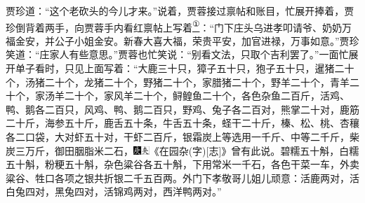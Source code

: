 贾珍道：``这个老砍头的今儿才来。''说着，贾蓉接过禀帖和账目，忙展开捧着，贾珍倒背着两手，向贾蓉手内看红禀帖上写着\href{../Text/part0057_split_000.html\#lnkback_1_a}{\textsuperscript{①}}：``门下庄头乌进孝叩请爷、奶奶万福金安，并公子小姐金安。新春大喜大福，荣贵平安，加官进禄，万事如意。''贾珍笑道：``庄家人有些意思。''贾蓉也忙笑说：``别看文法，只取个吉利罢了。''一面忙展开单子看时，只见上面写着：``大鹿三十只，獐子五十只，狍子五十只，暹猪二十个，汤猪二十个，龙猪二十个，野猪二十个，家腊猪二十个，野羊二十个，青羊二十个，家汤羊二十个，家风羊二十个，鲟鳇鱼二十个，各色杂鱼二百斤，活鸡、鸭、鹅各二百只，风鸡、鸭、鹅二百只，野鸡、兔子各二百对，熊掌二十对，鹿筋二十斤，海参五十斤，鹿舌五十条，牛舌五十条，蛏干二十斤，榛、松、桃、杏穰各二口袋，大对虾五十对，干虾二百斤，银霜炭上等选用一千斤、中等二千斤，柴炭三万斤，御田胭脂米二石，{\includegraphics[width=3mm]{../Images/00004}\includegraphics[width=3mm]{../Images/00012}\footnotesize \kaishu 《在园杂{(字)}{[}志{]}》曾有此说。}碧糯五十斛，白糯五十斛，粉粳五十斛，杂色粱谷各五十斛，下用常米一千石，各色干菜一车，外卖粱谷、牲口各项之银共折银二千五百两。外门下孝敬哥儿姐儿顽意：活鹿两对，活白兔四对，黑兔四对，活锦鸡两对，西洋鸭两对。''


